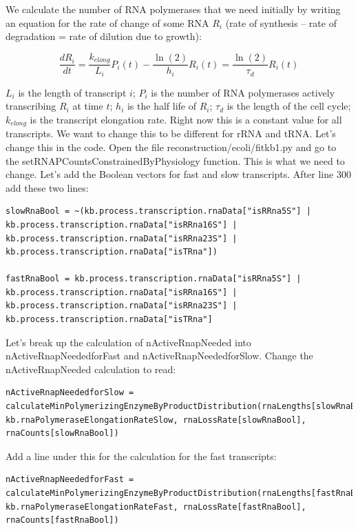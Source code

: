 \documentclass[12pt]{article}
\begin{document}
\par

We calculate the number of RNA polymerases that we need initially by writing an equation for the rate of change of some RNA $R_i$ (rate of synthesis – rate of degradation = rate of dilution due to growth):

$$
\frac{d R_i}{dt} = \frac{k_{elong}}{L_i}P_i(t) - \frac{\ln(2)}{h_i}R_i(t) = \frac{\ln(2)}{\tau_d}R_i(t)
$$


$L_i$ is the length of transcript $i$; $P_i$ is the number of RNA polymerases actively transcribing $R_i$ at time $t$; $h_i$ is the half life of $R_i$; $\tau_d$ is the length of the cell cycle; $k_{elong}$ is the transcript elongation rate. Right now this is a constant value for all transcripts. We want to change this to be different for rRNA and tRNA. Let’s change this in the code. Open the file reconstruction/ecoli/fitkb1.py and go to the setRNAPCountsConstrainedByPhysiology function. This is what we need to change. Let’s add the Boolean vectors for fast and slow transcripts. After line 300 add these two lines:

\lstset{language=Python}
\begin{lstlisting}
slowRnaBool = ~(kb.process.transcription.rnaData["isRRna5S"] | kb.process.transcription.rnaData["isRRna16S"] | kb.process.transcription.rnaData["isRRna23S"] | kb.process.transcription.rnaData["isTRna"])

fastRnaBool = kb.process.transcription.rnaData["isRRna5S"] | kb.process.transcription.rnaData["isRRna16S"] | kb.process.transcription.rnaData["isRRna23S"] | kb.process.transcription.rnaData["isTRna"]
\end{lstlisting}

Let’s break up the calculation of nActiveRnapNeeded into nActiveRnapNeededforFast and nActiveRnapNeededforSlow. Change the nActiveRnapNeeded calculation to read:

\begin{lstlisting}
nActiveRnapNeededforSlow = calculateMinPolymerizingEnzymeByProductDistribution(rnaLengths[slowRnaBool], kb.rnaPolymeraseElongationRateSlow, rnaLossRate[slowRnaBool], rnaCounts[slowRnaBool])
\end{lstlisting}

Add a line under this for the calculation for the fast transcripts:

\begin{lstlisting}
nActiveRnapNeededforFast = calculateMinPolymerizingEnzymeByProductDistribution(rnaLengths[fastRnaBool], kb.rnaPolymeraseElongationRateFast, rnaLossRate[fastRnaBool], rnaCounts[fastRnaBool])
\end{lstlisting}
\end{document}
